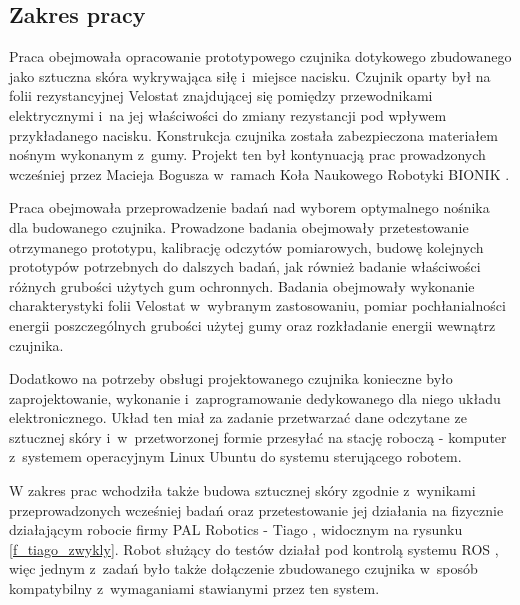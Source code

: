 
\subsection{Zakres pracy}
Praca obejmowała opracowanie prototypowego czujnika dotykowego zbudowanego jako sztuczna skóra wykrywająca siłę i~miejsce nacisku. Czujnik oparty był na folii rezystancyjnej Velostat znajdującej się pomiędzy przewodnikami elektrycznymi i~na jej właściwości do zmiany rezystancji pod wpływem przykładanego nacisku. Konstrukcja czujnika została zabezpieczona materiałem nośnym wykonanym z~gumy. Projekt ten był kontynuacją prac prowadzonych wcześniej przez Macieja Bogusza w~ramach Koła Naukowego Robotyki BIONIK \cite{b_report_otrzymane}.

Praca obejmowała przeprowadzenie badań nad wyborem optymalnego nośnika dla budowanego czujnika. Prowadzone badania obejmowały przetestowanie otrzymanego prototypu, kalibrację odczytów pomiarowych, budowę kolejnych prototypów potrzebnych do dalszych badań, jak również badanie właściwości różnych grubości użytych gum ochronnych. Badania obejmowały wykonanie charakterystyki folii Velostat w~wybranym zastosowaniu, pomiar pochłanialności energii poszczególnych grubości użytej gumy oraz rozkładanie energii wewnątrz czujnika.

Dodatkowo na potrzeby obsługi projektowanego czujnika konieczne było zaprojektowanie, wykonanie i~zaprogramowanie dedykowanego dla niego układu elektronicznego. Układ ten miał za zadanie przetwarzać dane odczytane ze sztucznej skóry i~w~przetworzonej formie przesyłać na stację roboczą - komputer z~systemem operacyjnym Linux Ubuntu do systemu sterującego robotem.

W zakres prac wchodziła także budowa sztucznej skóry zgodnie z~wynikami przeprowadzonych wcześniej badań oraz przetestowanie jej działania na fizycznie działającym robocie firmy PAL Robotics - Tiago \cite{b_site_tiago}, widocznym na rysunku \ref{f_tiago_zwykly}. Robot służący do testów działał pod kontrolą systemu ROS \cite{b_site_ROS}, więc jednym z~zadań było także dołączenie zbudowanego czujnika w~sposób kompatybilny z~wymaganiami stawianymi przez ten system.

